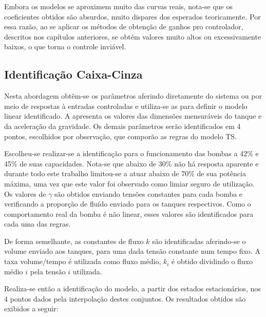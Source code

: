 Embora os modelos se aproximem muito das curvas reais, nota-se que os coeficientes obtidos são absurdos, muito dispares dos esperados teoricamente. Por essa razão, ao se aplicar os métodos de obtenção de ganhos pro controlador, descritos nos capítulos anteriores, se obtém valores muito altos ou excessivamente baixos, o que torna o controle inviável.

\subsection{Identificação Caixa-Cinza}

Nesta abordagem obtêm-se os parâmetros aferindo diretamente do sistema ou por meio de respostas à entradas controladas e utiliza-se as  para definir o modelo linear identificado. A  apresenta os valores das dimensões mensuráveis do tanque e da aceleração da gravidade. Os demais parâmetros serão identificados em 4 pontos, escolhidos por observação, que comporão as regras do modelo TS. 

Escolheu-se realizar-se a identificação para o funcionamento das bombas a 42\% e 45\% de suas capacidades. Nota-se que abaixo de 30\% não há resposta aparente e durante todo este trabalho limitou-se a atuar abaixo de 70\% de sua potência máxima, uma vez que este valor foi observado como limiar seguro de utilização. Os valores de $\gamma$ são obtidos enviando tensões constantes para cada bomba e verificando a proporção de fluído enviado para os tanques respectivos. Como o comportamento real da bomba é não linear, esses valores são identificados para cada uma das regras.

De forma semelhante, as constantes de fluxo $k$ são identificadas aferindo-se o volume enviado aos tanques, para uma dada tensão constante num tempo fixo. A taxa volume/tempo é utilizada como fluxo médio, $k_i$ é obtido dividindo o fluxo médio $i$ pela tensão $i$ utilizada.

\begin{table}[!ht]
	\caption{Tensões Escolhidas}
	\label{tabIdentKs}
	\small
	\centering
\end{table}
Realiza-se então a identificação do modelo, a partir dos estados estacionários, nos 4 pontos dados pela interpolação destes conjuntos. Os resultados obtidos são exibidos a seguir:

